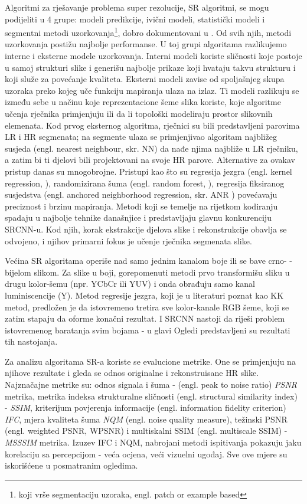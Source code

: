 \documentclass[12pt]{report}
\numberwithin{equation}{section}
\begin{document}
Algoritmi za rješavanje problema super rezolucije, SR algoritmi, \cite{alg} se mogu podijeliti u 4 grupe: modeli predikcije, ivični modeli, statistički modeli i segmentni metodi uzorkovanja\footnote{koji vrše segmentaciju uzoraka, engl. patch or example based}, dobro dokumentovani u \cite{alg2}. Od svih njih, metodi uzorkovanja postižu najbolje performanse. U toj grupi algoritama razlikujemo interne i eksterne modele uzorkovanja. Interni modeli koriste sličnosti koje postoje u samoj strukturi slike i generišu najbolje prikaze koji hvataju takvu strukturu i koji služe za povećanje kvaliteta. Eksterni modeli zavise od spoljašnjeg skupa uzoraka preko kojeg uče funkciju mapiranja ulaza na izlaz. Ti modeli razlikuju se između sebe u načinu koje reprezentacione šeme slika koriste, koje algoritme učenja rječnika primjenjuju ili da li topološki modeliraju prostor slikovnih elemenata. Kod prvog eksternog algoritma, rječnici su bili predstavljeni parovima LR i HR segmenata; na segmente ulaza se primjenjivao algoritam najbližeg susjeda (engl. nearest neighbour, skr. NN) da nađe njima najbliže u LR rječniku, a zatim bi ti djelovi bili projektovani na svoje HR parove. Alternative za ovakav pristup danas su mnogobrojne. Pristupi kao što su regresija jezgra (engl. kernel regression, \cite{kernel}), randomizirana šuma (engl. random forest, \cite{forest}), regresija fiksiranog susjedstva (engl. anchored neighborhood regression, skr. ANR \cite{anr}) povećavaju preciznost i brzinu mapiranja. Metodi koji se temelje na rijetkom kodiranju spadaju u najbolje tehnike današnjice i predstavljaju glavnu konkurenciju SRCNN-u. Kod njih, korak ekstrakcije djelova slike i rekonstrukcije obavlja se odvojeno, i njihov primarni fokus je učenje rječnika segmenata slike.   

Većina SR algoritama operiše nad samo jednim kanalom boje ili se bave crno-
-bijelom slikom. Za slike u boji, gorepomenuti metodi prvo transformišu sliku u drugu kolor-šemu (npr. YCbCr ili YUV) i onda obrađuju samo kanal luminiscencije (Y). Metod regresije jezgra, koji je u literaturi poznat kao KK metod, predložen je da istovremeno tretira sve kolor-kanale RGB šeme, koji se zatim stapaju da oforme konačni rezultat. I SRCNN nastoji da riješi problem istovremenog baratanja svim bojama - u glavi Ogledi predstavljeni su rezultati tih nastojanja.

Za analizu algoritama SR-a koriste se evalucione metrike. One se primjenjuju na njihove rezultate i gleda se odnos originalne i rekonstruisane HR slike. Najznačajne metrike \cite{alg2} su: odnos signala i šuma - (engl. peak to noise ratio) \textit{PSNR} metrika, metrika indeksa strukturalne sličnosti (engl. structural similarity index) - \textit{SSIM}, kriterijum povjerenja informacije (engl. information fidelity criterion) \textit{IFC}, mjera kvaliteta šuma \textit{NQM} (engl. noise quality measure), težinski PSNR (engl. weighted PSNR, WPSNR) i multiskalni SSIM (engl. multiscale SSIM) - \textit{MSSSIM} metrika. Izuzev IFC i NQM, nabrojani metodi ispitivanja pokazuju jaku korelaciju sa percepcijom - veća ocjena, veći vizuelni ugođaj. Sve ove mjere su iskorišćene u posmatranim ogledima.    
\end{document}
